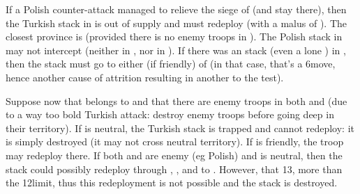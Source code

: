 \begin{exemple}
  If a Polish counter-attack managed to relieve the siege of \provinceBanat
  (and stay there), then the Turkish stack in \provinceMagyarorszag is out of
  supply and must redeploy (with a malus of ). The closest province
  is \provinceSerbia (provided there is no enemy troops in
  \provinceCroatie). The Polish stack in \provinceBanat may not intercept
  (neither in \provinceCroatie, nor in \provinceSerbia). If there was an
  \paysHongrie stack (even a lone \LD) in \provinceCroatie, then the stack
  must go to either \provinceMoldova (if friendly) of \provinceValahia (in
  that case, that's a 6\MP move, hence another cause of attrition resulting in
  another  to the test).
\end{exemple}

\begin{exemple}
  Suppose now that \provinceDalmacija belongs to \VEN and that there are enemy
  troops in both \provinceCroatie and \provinceErdely (due to a way too bold
  Turkish attack: destroy enemy troops before going deep in their
  territory). If \paysMoldavie is neutral, the Turkish stack is trapped and
  cannot redeploy: it is simply destroyed (it may not cross neutral
  territory). If \provinceMoldova is friendly, the troop may redeploy
  there. If both \provinceMoldova and \provinceBasarabia are enemy (eg Polish)
  and \provinceValahia is neutral, then the stack could possibly redeploy
  through \provinceKarpatok, \provinceBukovina, \provinceMoldova and
  \provinceBasarabia to \provinceRumeli. However, that 13\MP, more than the
  12\MP limit, thus this redeployment is not possible and the stack is
  destroyed.
\end{exemple}

